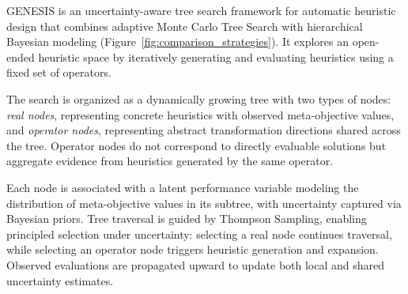 \documentclass[sigconf,anonymous]{aamas}
\begin{document}



GENESIS is an uncertainty-aware tree search framework for automatic heuristic design that combines adaptive Monte Carlo Tree Search with hierarchical Bayesian modeling (Figure~\ref{fig:comparison_strategies}). It explores an open-ended heuristic space by iteratively generating and evaluating heuristics using a fixed set of operators.

The search is organized as a dynamically growing tree with two types of nodes: \emph{real nodes}, representing concrete heuristics with observed meta-objective values, and \emph{operator nodes}, representing abstract transformation directions shared across the tree. Operator nodes do not correspond to directly evaluable solutions but aggregate evidence from heuristics generated by the same operator.

Each node is associated with a latent performance variable modeling the distribution of meta-objective values in its subtree, with uncertainty captured via Bayesian priors. Tree traversal is guided by Thompson Sampling, enabling principled selection under uncertainty: selecting a real node continues traversal, while selecting an operator node triggers heuristic generation and expansion. Observed evaluations are propagated upward to update both local and shared uncertainty estimates.
\end{document}
